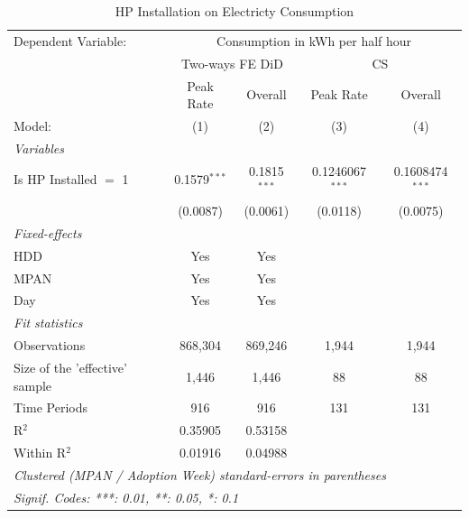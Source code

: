 
\begin{table}[htbp]
   \caption{\label{tab:hp-did} HP Installation on Electricty Consumption}
   \centering
   \begin{tabular}{lcccc}
      \tabularnewline \midrule \midrule
      Dependent Variable: & \multicolumn{4}{c}{Consumption in kWh per half hour}\\
       & \multicolumn{2}{c}{Two-ways FE DiD} & \multicolumn{2}{c}{CS} \\ 
                                     & Peak Rate      & Overall        & Peak Rate      & Overall \\   
      Model:                         & (1)            & (2)            & (3)            & (4)\\  
      \midrule
      \emph{Variables}\\
      Is HP Installed $=$ 1          & 0.1579$^{***}$ & 0.1815$^{***}$ & 0.1246067$^{***}$ & 0.1608474$^{***}$\\   
                                     & (0.0087)       & (0.0061)       & (0.0118)       & (0.0075)\\   
      \midrule
      \emph{Fixed-effects}\\
      HDD                            & Yes            & Yes            &             & \\  
      MPAN                           & Yes            & Yes            &             & \\  
      Day                            & Yes            & Yes            &             & \\  
      \midrule
      \emph{Fit statistics}\\
      Observations                   & 868,304        & 869,246        & 1,944        & 1,944\\  
      Size of the 'effective' sample & 1,446          & 1,446          & 88          & 88 \\
      Time Periods                   & 916         & 916          & 131          & 131 \\  
      R$^2$                          & 0.35905        & 0.53158        &         & \\  
      Within R$^2$                   & 0.01916        & 0.04988        &         & \\  

      \midrule \midrule
      \multicolumn{5}{l}{\emph{Clustered (MPAN / Adoption Week) standard-errors in parentheses}}\\
      \multicolumn{5}{l}{\emph{Signif. Codes: ***: 0.01, **: 0.05, *: 0.1}}\\

   \end{tabular}
\end{table}


